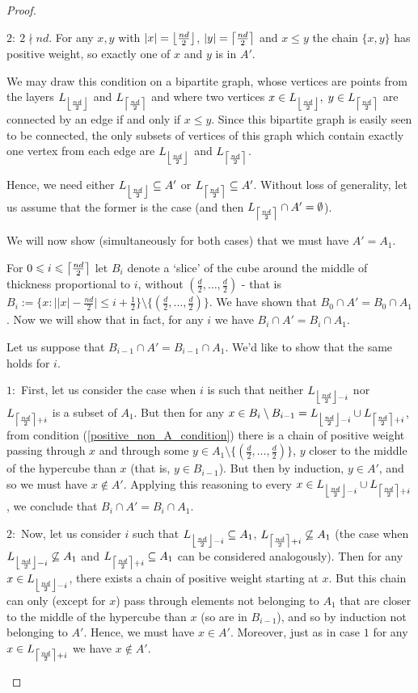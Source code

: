 \documentclass[11pt, reqno]{amsart}
\newenvironment{caseindent}[1][2em]
  {%
    \begin{list}{}{%
      \setlength{\leftmargin}{#1}%
      \setlength{\rightmargin}{0pt}%
      \setlength{\topsep}{0pt}%
      \setlength{\partopsep}{0pt}%
      \setlength{\itemsep}{0pt}%
      \setlength{\parsep}{\parskip}%
      \setlength{\listparindent}{\parindent}%
    }%
    \item[]%
    \let\fullwidthdisplay\relax
    \ignorespaces
  }
  {%
    \end{list}%
    \ignorespacesafterend
  }
\theoremstyle{remark}
\numberwithin{equation}{section}
\newcommand{\fclass}{\mathchoice
  {\left\lfloor \frac{nd}{2} \right\rfloor}
  {\big\lfloor \frac{nd}{2} \big\rfloor}
  {\big\lfloor \frac{nd}{2} \big\rfloor}
  {\big\lfloor \frac{nd}{2} \big\rfloor}}
\newcommand{\cclass}{\mathchoice
  {\left\lceil \frac{nd}{2} \right\rceil}
  {\big\lceil \frac{nd}{2} \big\rceil}
  {\big\lceil \frac{nd}{2} \big\rceil}
  {\big\lceil \frac{nd}{2} \big\rceil}}
\newcommand{\thespecialpoint}{(\frac{d}{2}, \ldots, \frac{d}{2})}
\begin{document}
\begin{proof}
\begin{caseindent}
    $2: \ 2 \nmid nd.$ For any $x, y$ with $\vert x\vert =\fclass$, $\vert y\vert =\cclass$ and $x \leqslant y$ the chain $\{x, y\}$ has positive weight, so exactly one of $x$ and $y$ is in $A'$.
    
    We may draw this condition on a bipartite graph, whose vertices are points from the layers $L_{\fclass}$ and $L_{\cclass}$ and where two vertices $x \in L_{\fclass},$ $y \in L_{\cclass}$ are connected by an edge if and only if $x \leqslant y$. Since this bipartite graph is easily seen to be connected, the only subsets of vertices of this graph which contain exactly one vertex from each edge are $L_{\fclass}$ and $L_{\cclass}$.

    Hence, we need either $L_{\fclass} \subseteq A'$ or $L_{\cclass} \subseteq A'$. Without loss of generality, let us assume that the former is the case (and then $L_{\cclass} \cap A'=\emptyset$).
    \end{caseindent}
    
    We will now show (simultaneously for both cases) that we must have $A'=A_1$.

    For $0 \leqslant i \leqslant \cclass$ let $B_i$ denote a `slice' of the cube around the middle of thickness proportional to $i$, without $\thespecialpoint$ - that is $B_i:=\{x: \big\vert \vert x\vert -\frac{nd}{2}\big\vert  \leqslant i + \frac{1}{2}\} \setminus \{\thespecialpoint\}$. We have shown that $B_0 \cap A'=B_0 \cap A_1$. Now we will show that in fact, for any $i$ we have $B_i \cap A'=B_i\cap A_1$.

    Let us suppose that $B_{i-1} \cap A' = B_{i-1} \cap A_1$. We'd like to show that the same holds for $i$.

    \begin{caseindent}
        $1:$ First, let us consider the case when $i$ is such that neither $L_{\fclass - i}$ nor $L_{\cclass + i}$ is a subset of $A_1$. But then for any $x \in B_i \setminus B_{i-1} = L_{\fclass - i} \cup L_{\cclass + i}$, from condition (\ref{positive_non_A_condition}) there is a chain of positive weight passing through $x$ and through some $y \in A_1 \setminus \{\thespecialpoint\}$, $y$ closer to the middle of the hypercube than $x$ (that is, $y \in B_{i-1}$). But then by induction, $y \in A'$, and so we must have $x \notin A'$. Applying this reasoning to every $x \in L_{\fclass - i} \cup L_{\cclass + i}$, we conclude that $B_i \cap A'=B_i \cap A_1$.

        $2:$ Now, let us consider $i$ such that $L_{\fclass - i} \subseteq A_1$, $L_{\cclass + i} \not\subseteq A_1$ (the case when $L_{\fclass - i} \not\subseteq A_1$ and $L_{\cclass + i} \subseteq A_1$ can be considered analogously). Then for any $x \in L_{\fclass - i}$, there exists a chain of positive weight starting at $x$. But this chain can only (except for $x$) pass through elements not belonging to $A_1$ that are closer to the middle of the hypercube than $x$ (so are in $B_{i-1}$), and so by induction not belonging to $A'$. Hence, we must have $x \in A'$. Moreover, just as in case $1$ for any $x \in L_{\cclass + i}$ we have $x \not\in A'$. 


\end{caseindent}
\end{proof}
\end{document}
